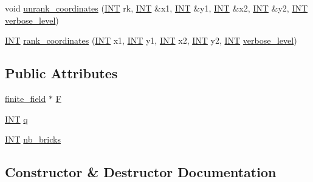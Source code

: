 \begin{DoxyCompactItemize}
\item 
void \mbox{\hyperlink{classbrick__domain_a2a4035be65c27fa4eaafae8db1fdf314}{unrank\+\_\+coordinates}} (\mbox{\hyperlink{galois_8h_a09fddde158a3a20bd2dcadb609de11dc}{I\+NT}} rk, \mbox{\hyperlink{galois_8h_a09fddde158a3a20bd2dcadb609de11dc}{I\+NT}} \&x1, \mbox{\hyperlink{galois_8h_a09fddde158a3a20bd2dcadb609de11dc}{I\+NT}} \&y1, \mbox{\hyperlink{galois_8h_a09fddde158a3a20bd2dcadb609de11dc}{I\+NT}} \&x2, \mbox{\hyperlink{galois_8h_a09fddde158a3a20bd2dcadb609de11dc}{I\+NT}} \&y2, \mbox{\hyperlink{galois_8h_a09fddde158a3a20bd2dcadb609de11dc}{I\+NT}} \mbox{\hyperlink{simeon_8_c_a818073fbcc2f439e7c56952f67386122}{verbose\+\_\+level}})
\item 
\mbox{\hyperlink{galois_8h_a09fddde158a3a20bd2dcadb609de11dc}{I\+NT}} \mbox{\hyperlink{classbrick__domain_a84f4df99770f492278a079177c09eaf3}{rank\+\_\+coordinates}} (\mbox{\hyperlink{galois_8h_a09fddde158a3a20bd2dcadb609de11dc}{I\+NT}} x1, \mbox{\hyperlink{galois_8h_a09fddde158a3a20bd2dcadb609de11dc}{I\+NT}} y1, \mbox{\hyperlink{galois_8h_a09fddde158a3a20bd2dcadb609de11dc}{I\+NT}} x2, \mbox{\hyperlink{galois_8h_a09fddde158a3a20bd2dcadb609de11dc}{I\+NT}} y2, \mbox{\hyperlink{galois_8h_a09fddde158a3a20bd2dcadb609de11dc}{I\+NT}} \mbox{\hyperlink{simeon_8_c_a818073fbcc2f439e7c56952f67386122}{verbose\+\_\+level}})
\end{DoxyCompactItemize}
\subsection*{Public Attributes}
\begin{DoxyCompactItemize}
\item 
\mbox{\hyperlink{classfinite__field}{finite\+\_\+field}} $\ast$ \mbox{\hyperlink{classbrick__domain_afb4bb92545a6283dc398759f273dc889}{F}}
\item 
\mbox{\hyperlink{galois_8h_a09fddde158a3a20bd2dcadb609de11dc}{I\+NT}} \mbox{\hyperlink{classbrick__domain_a033ed6bb9795ceb3e85240e5fc04cdbc}{q}}
\item 
\mbox{\hyperlink{galois_8h_a09fddde158a3a20bd2dcadb609de11dc}{I\+NT}} \mbox{\hyperlink{classbrick__domain_a166b064b1ebd1270c91a2e0efe265a32}{nb\+\_\+bricks}}
\end{DoxyCompactItemize}


\subsection{Constructor \& Destructor Documentation}
\mbox{\label{classbrick__domain_ac26a11b2d605af091fe49ade4aea2c8e}} 
